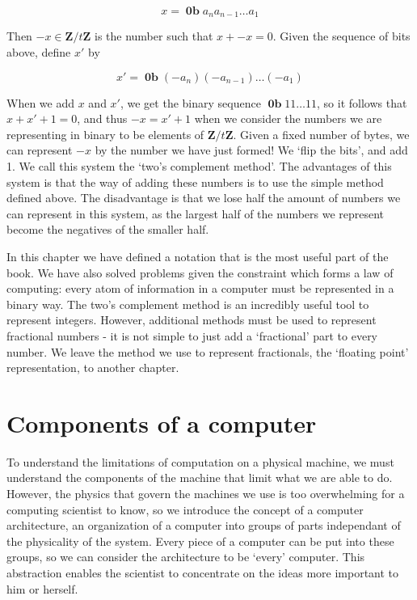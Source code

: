 \documentclass{report}
\DeclareMathOperator{\bin}{\mathbf{0b}}
\begin{document}
\[ x = \bin a_n a_{n-1} \dots a_{1} \]

\noindent Then $-x \in \mathbf{Z}/t\mathbf{Z}$ is the number such that $x + -x = 0$. Given the sequence of bits above, define $x'$ by

\[ x' = \bin (-a_n)(-a_{n-1}) \dots (-a_1) \]

\noindent When we add $x$ and $x'$, we get the binary sequence $\bin 11 \dots 11$, so it follows that $x + x' + 1 = 0$, and thus $-x = x' + 1$ when we consider the numbers we are representing in binary to be elements of $\mathbf{Z}/t\mathbf{Z}$. Given a fixed number of bytes, we can represent $-x$ by the number we have just formed! We `flip the bits', and add 1. We call this system the `two's complement method'. The advantages of this system is that the way of adding these numbers is to use the simple method defined above. The disadvantage is that we lose half the amount of numbers we can represent in this system, as the largest half of the numbers we represent become the negatives of the smaller half.

In this chapter we have defined a notation that is the most useful part of the book. We have also solved problems given the constraint which forms a law of computing: every atom of information in a computer must be represented in a binary way. The two's complement method is an incredibly useful tool to represent integers. However, additional methods must be used to represent fractional numbers - it is not simple to just add a `fractional' part to every number. We leave the method we use to represent fractionals, the `floating point' representation, to another chapter.

\chapter{Components of a computer}

To understand the limitations of computation on a physical machine, we must understand the components of the machine that limit what we are able to do. However, the physics that govern the machines we use is too overwhelming for a computing scientist to know, so we introduce the concept of a computer architecture, an organization of a computer into groups of parts independant of the physicality of the system. Every piece of a computer can be put into these groups, so we can consider the architecture to be `every' computer. This abstraction enables the scientist to concentrate on the ideas more important to him or herself.
\end{document}

